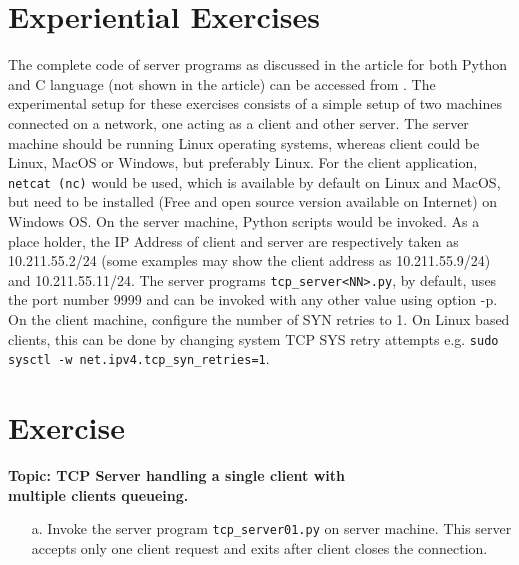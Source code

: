 \begin{multicols}{2}
\vspace{-.3cm}

\section{Experiential Exercises}

\vspace{-.2cm}

The complete code of server programs as discussed in the article for both Python and C language (not shown in the article) can be accessed from \cite{art1-key17}. The experimental setup for these exercises consists of a simple setup of two machines connected on a network, one acting as a client and other server. The server machine should be running Linux operating systems, whereas client could be Linux, MacOS or Windows, but preferably Linux. For the client application, \texttt{netcat (nc)} \cite{art1-key18} would be used, which is available by default on Linux and MacOS, but need to be installed (Free and open source version available on Internet) on Windows OS. On the server machine, Python scripts would be invoked. As a place holder, the IP Address of client and server are respectively taken as 10.211.55.2/24 (some examples may show the client address as 10.211.55.9/24) and 10.211.55.11/24. The server programs \texttt{tcp\_server<NN>.py}, by default, uses the port number 9999 and can be invoked with any other value using option -p. On the client machine, configure the number of SYN retries to 1. On Linux based clients, this can be done by changing system TCP SYS retry attempts e.g. \texttt{sudo sysctl -w  net.ipv4.tcp\_syn\_retries=1}.

\vspace{-.3cm}

\setcounter{section}{0}
\section*{Exercise \label{chap1-exe01}}

\vspace{-.2cm}

\textbf{Topic: TCP Server handling a single client with\\ multiple clients queueing.}

\vspace{-.2cm}

\begin{itemize}
\item[a.] Invoke the server program \texttt{tcp\_server01.py} on server machine. This server accepts only one client request and exits after client closes the connection.


\end{itemize}
\end{multicols}
